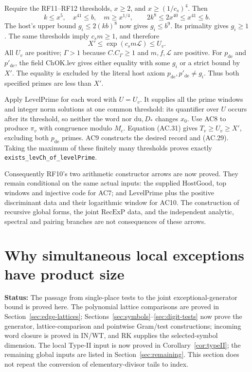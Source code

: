 \documentclass[11pt,a4paper]{article}
\numberwithin{equation}{section}
\theoremstyle{remark}\newtheorem{remark}[theorem]{Remark}
\newcommand{\status}[1]{\textbf{Status:} #1}
\begin{document}
Require the RF11--RF12 thresholds, $x\geq2$, and
$x\geq(1/c_s)^4$. Then
\[
 k\leq x^5,\quad x^{41}\leq b,\quad m\geq x^{1/4},
        \qquad 2k^8\leq2x^{40}\leq x^{41}\leq b.
\]
The host's upper bound $g_i\leq2(kb)^8$ now gives $g_i\leq b^9$.
Its primality gives $g_i\geq1$.
The same thresholds imply $c_s m\geq1$, and therefore
\[
              X'\leq\exp(c_s m\mathcal L)\leq U_v.
                                                               \tag{AC.31}
\]
All $U_v$ are positive; $\Gamma>1$ because $C.C_\Gamma\geq1$
and $m,f,\mathcal L$ are positive.
For $p_{\mathrm{de}}$ and $p'_{\mathrm{de}}$, the field
$\mathrm{ChOK.lev}$ gives either equality with some $g_i$ or a
strict bound by $X'$. The equality is excluded by the literal host
axiom $p_{\mathrm{de}},p'_{\mathrm{de}}\ne g_i$.
Thus both specified primes are less than $X'$.

Apply $\mathrm{LevelPrime}$ for each word with $U=U_v$.
It supplies all the prime windows and integer norm solutions at
one common threshold: its quantifier over $U$ occurs after its
threshold, so neither the word nor $\mathrm{du},D_*$ changes $x_0$.
Use AC8 to produce $\pi_v$ with congruence modulo $M_c$.
Equation (AC.31) gives $T_v\geq U_v\geq X'$, excluding both
$p_{\mathrm{de}}$ primes. AC9 constructs the desired record and
(AC.29). Taking the maximum of these finitely many thresholds
proves exactly \texttt{exists\_\allowbreak levCh\_\allowbreak of\_\allowbreak levelPrime}.

Consequently RF10's two arithmetic constructor arrows are now proved.
They remain conditional on the same actual inputs: the supplied
$\mathrm{HostGood}$, top windows and injective code for AC7; and
$\mathrm{LevelPrime}$ plus the positive discriminant data and their
logarithmic window for AC10. The construction of recursive global
forms, the joint $\mathrm{RecExP}$ data, and the independent analytic,
spectral and pairing branches are not consequences of these arrows.


\section{Why simultaneous local exceptions have product size}\label{sec:joint-rank}

\status{The passage from single-place tests to the joint exceptional-generator bound is proved here. The polynomial lattice comparisons are proved in Section~\ref{sec:edge-lattices}; Sections~\ref{sec:symbols}--\ref{sec:digit-tests} now prove the generator, lattice-comparison and pointwise Gram/test constructions; incoming word closure is proved in IN/WT, and RK supplies the selected-symbol dimension. The local Type-II input is now proved in Corollary~\ref{cor:typeII}; the remaining global inputs are listed in Section~\ref{sec:remaining}. This section does not repeat the conversion of elementary-divisor tails to index.}
\end{document}
